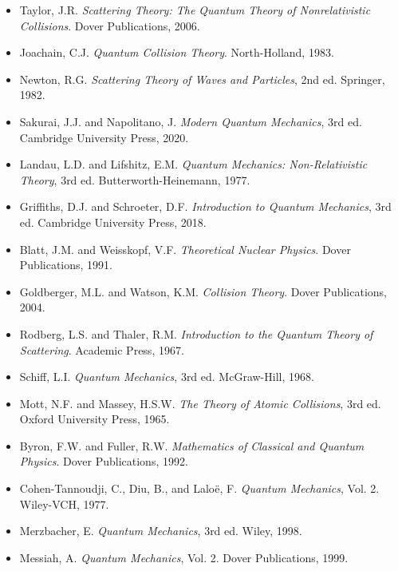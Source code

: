 \documentclass[a4paper, 11pt]{article}
\begin{document}
\begin{itemize}
\item Taylor, J.R. \textit{Scattering Theory: The Quantum Theory of Nonrelativistic Collisions}.
Dover Publications, 2006.

\item Joachain, C.J. \textit{Quantum Collision Theory}. North-Holland, 1983.

\item Newton, R.G. \textit{Scattering Theory of Waves and Particles}, 2nd ed. Springer, 1982.

\item Sakurai, J.J. and Napolitano, J. \textit{Modern Quantum Mechanics}, 3rd ed. Cambridge
University Press, 2020.

\item Landau, L.D. and Lifshitz, E.M. \textit{Quantum Mechanics: Non-Relativistic Theory},
3rd ed. Butterworth-Heinemann, 1977.

\item Griffiths, D.J. and Schroeter, D.F. \textit{Introduction to Quantum Mechanics}, 3rd ed.
Cambridge University Press, 2018.

\item Blatt, J.M. and Weisskopf, V.F. \textit{Theoretical Nuclear Physics}. Dover Publications, 1991.

\item Goldberger, M.L. and Watson, K.M. \textit{Collision Theory}. Dover Publications, 2004.

\item Rodberg, L.S. and Thaler, R.M. \textit{Introduction to the Quantum Theory of Scattering}.
Academic Press, 1967.

\item Schiff, L.I. \textit{Quantum Mechanics}, 3rd ed. McGraw-Hill, 1968.

\item Mott, N.F. and Massey, H.S.W. \textit{The Theory of Atomic Collisions}, 3rd ed. Oxford
University Press, 1965.

\item Byron, F.W. and Fuller, R.W. \textit{Mathematics of Classical and Quantum Physics}.
Dover Publications, 1992.

\item Cohen-Tannoudji, C., Diu, B., and Laloë, F. \textit{Quantum Mechanics}, Vol. 2.
Wiley-VCH, 1977.

\item Merzbacher, E. \textit{Quantum Mechanics}, 3rd ed. Wiley, 1998.

\item Messiah, A. \textit{Quantum Mechanics}, Vol. 2. Dover Publications, 1999.
\end{itemize}
\end{document}
